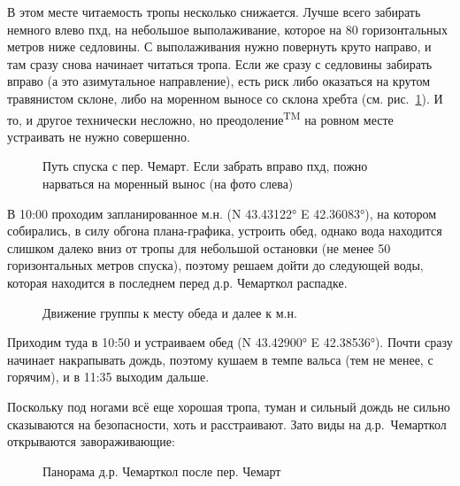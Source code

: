 В этом месте читаемость тропы несколько снижается. Лучше всего забирать немного влево пхд, на небольшое выполаживание, которое на 80 горизонтальных метров ниже седловины. С выполаживания нужно повернуть круто направо, и там сразу снова начинает читаться тропа. Если же сразу с седловины забирать вправо (а это азимутальное направление), есть риск либо оказаться на крутом травянистом склоне, либо на моренном выносе со склона хребта (см. рис.~\ref{fig:chemart_scheme}). И то, и другое технически несложно, но преодоление\textsuperscript{TM} на ровном месте устраивать не нужно совершенно.


\begin{figure}[h!]
	\centering
	\caption{Путь спуска с пер. Чемарт. Если забрать вправо пхд, пожно нарваться на моренный вынос (на фото слева)}
	\label{fig:chemart_scheme}
\end{figure}

В 10:00 проходим запланированное м.н. (N 43.43122° E 42.36083°), на котором собирались, в силу обгона плана-графика, устроить обед, однако вода находится слишком далеко вниз от тропы для небольшой остановки (не менее 50 горизонтальных метров спуска), поэтому решаем дойти до следующей воды, которая находится в последнем перед д.р. Чемарткол распадке.

\begin{figure}[h!]
	\centering
	\caption{Движение группы к месту обеда и далее к м.н.}
	\label{fig:sep07_route}
\end{figure}										

																
Приходим туда в 10:50 и устраиваем обед (N 43.42900° E 42.38536°). Почти сразу начинает накрапывать дождь, поэтому кушаем в темпе вальса (тем не менее, с горячим), и в 11:35 выходим дальше. 

Поскольку под ногами всё еще хорошая тропа, туман и сильный дождь не сильно сказываются на безопасности, хоть и расстраивают. Зато виды на д.р.~Чемарткол открываются завораживающие:

\begin{figure}[h!]
	\centering
	\caption{Панорама д.р. Чемарткол после пер. Чемарт}
	\label{fig:chemart_panorama}
\end{figure}										

